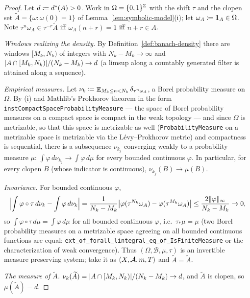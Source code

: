 \begin{proof}
  \leanok
  Let $d \coloneqq d^{\ast}(A) > 0$.  Work in $\Omega = \{0,1\}^{\mathbb{Z}}$ with the shift $\tau$ and
  the clopen set $\widetilde A = \{\omega : \omega(0) = 1\}$ of Lemma~\ref{lem:symbolic-model}(i);
  let $\omega_A \coloneqq \mathbf{1}_A \in \Omega$.  Note $\tau^n\omega_A \in \tau^{-r}\widetilde A$
  iff $\omega_A(n + r) = 1$ iff $n + r \in A$.

  \emph{Windows realizing the density.}  By Definition~\ref{def:banach-density} there are
  windows $[M_k,N_k)$ of integers with $N_k - M_k \to \infty$ and
  $\lvert A \cap [M_k,N_k) \rvert/(N_k - M_k) \to d$ (a limsup along a countably generated filter is
  attained along a sequence).

  \emph{Empirical measures.}  Let
  $\nu_k \coloneqq \mathop{\mathbb{E}}_{M_k \leq n < N_k} \delta_{\tau^n\omega_A}$, a Borel probability measure on
  $\Omega$.  By (i) and Mathlib's Prokhorov theorem in the form
  \texttt{instCompactSpaceProbabilityMeasure} --- the space of Borel probability measures on a
  compact space is compact in the weak topology --- and since $\Omega$ is metrizable, so that
  this space is metrizable as well (\texttt{ProbabilityMeasure} on a metrizable space is
  metrizable via the L\'evy--Prokhorov metric) and compactness is sequential, there is a
  subsequence $\nu_{k_j}$ converging weakly to a probability measure $\mu$:
  $\int \varphi\,d\nu_{k_j} \to \int\varphi\,d\mu$ for every bounded continuous $\varphi$.  In
  particular, for every clopen $B$ (whose indicator is continuous), $\nu_{k_j}(B) \to \mu(B)$.

  \emph{Invariance.}  For bounded continuous $\varphi$,
  \[
    \Bigl\lvert \int \varphi\circ\tau\,d\nu_k - \int\varphi\,d\nu_k \Bigr\rvert
      = \frac{1}{N_k - M_k}\bigl\lvert \varphi(\tau^{N_k}\omega_A) - \varphi(\tau^{M_k}\omega_A) \bigr\rvert
      \leq \frac{2\lVert \varphi \rVert_\infty}{N_k - M_k} \to 0 ,
  \]
  so $\int\varphi\circ\tau\,d\mu = \int\varphi\,d\mu$ for all bounded continuous $\varphi$, i.e.\
  $\tau_\ast\mu = \mu$ (two Borel probability measures on a metrizable space agreeing on all
  bounded continuous functions are equal: \texttt{ext\_of\_forall\_lintegral\_eq\_of\_IsFiniteMeasure}
  or the characterization of weak convergence).  Thus $(\Omega,\mathcal B,\mu,\tau)$ is an
  invertible measure preserving system; take it as $(X,\mathcal{A},m,T)$ and $\tilde A = \widetilde A$.

  \emph{The measure of $\widetilde A$.}  $\nu_k(\widetilde A) = \lvert A \cap [M_k,N_k) \rvert/(N_k-M_k) \to d$,
  and $\widetilde A$ is clopen, so $\mu(\widetilde A) = d$.


\end{proof}
